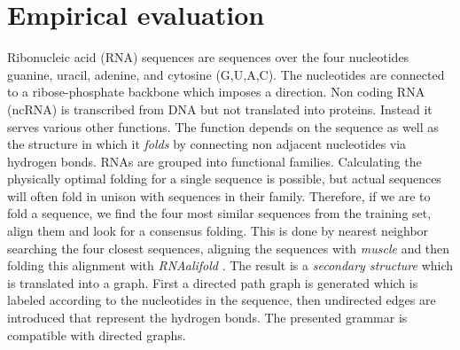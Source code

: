 \documentclass{article}
\begin{document}





\section{Empirical evaluation}

Ribonucleic acid (RNA) sequences are sequences over the four nucleotides guanine,
uracil, adenine, and cytosine (G,U,A,C).
The nucleotides are connected to a ribose-phosphate backbone which imposes a
direction. Non coding RNA (ncRNA) is transcribed from DNA but not
translated into proteins. Instead it serves various other functions.
The function depends on the sequence as well as the structure in which it 
\emph{folds} by connecting non adjacent nucleotides via hydrogen bonds. 
RNAs are grouped into functional families\cite{rfam}.
Calculating the physically optimal folding for a single sequence
is possible, but actual sequences will often fold in unison with 
sequences in their family. Therefore, if we are to fold a sequence,
we find the four most similar sequences from the training set, align them  and 
look for a consensus folding.
This is done by nearest neighbor searching the four closest sequences, 
aligning the sequences with \emph{muscle} \cite{muscle}
and then folding this alignment with \emph{RNAalifold}
\cite{rnaalifold}.  
The result is a \emph{secondary structure} which is translated into a 
graph. First a directed path graph is generated which is labeled
according to the nucleotides in the sequence, then undirected edges 
are introduced that represent the hydrogen bonds.
The presented grammar is compatible with directed graphs.
\end{document}

